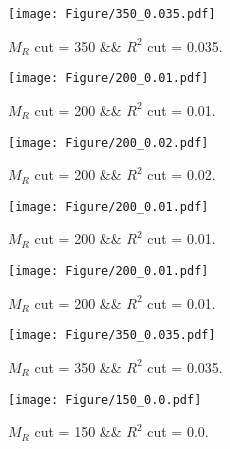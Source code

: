  
\begin{figure}[H] 
\begin{center} 
\texttt{[image: Figure/350\_0.035.pdf]} 
\caption{$M_R$ cut = 350 \&\& $R^2$ cut = 0.035.} 
\label{Fig:350_0.035} 
\end{center} 
\end{figure} 
 
 
\begin{figure}[H] 
\begin{center} 
\texttt{[image: Figure/200\_0.01.pdf]} 
\caption{$M_R$ cut = 200 \&\& $R^2$ cut = 0.01.} 
\label{Fig:200_0.01} 
\end{center} 
\end{figure} 
 
 
\begin{figure}[H] 
\begin{center} 
\texttt{[image: Figure/200\_0.02.pdf]} 
\caption{$M_R$ cut = 200 \&\& $R^2$ cut = 0.02.} 
\label{Fig:200_0.02} 
\end{center} 
\end{figure} 
 
 
\begin{figure}[H] 
\begin{center} 
\texttt{[image: Figure/200\_0.01.pdf]} 
\caption{$M_R$ cut = 200 \&\& $R^2$ cut = 0.01.} 
\label{Fig:200_0.01} 
\end{center} 
\end{figure} 
 
 
\begin{figure}[H] 
\begin{center} 
\texttt{[image: Figure/200\_0.01.pdf]} 
\caption{$M_R$ cut = 200 \&\& $R^2$ cut = 0.01.} 
\label{Fig:200_0.01} 
\end{center} 
\end{figure} 
 
 
\begin{figure}[H] 
\begin{center} 
\texttt{[image: Figure/350\_0.035.pdf]} 
\caption{$M_R$ cut = 350 \&\& $R^2$ cut = 0.035.} 
\label{Fig:350_0.035} 
\end{center} 
\end{figure} 
 
 
\begin{figure}[H] 
\begin{center} 
\texttt{[image: Figure/150\_0.0.pdf]} 
\caption{$M_R$ cut = 150 \&\& $R^2$ cut = 0.0.} 
\label{Fig:150_0.0} 
\end{center} 
\end{figure} 
 
